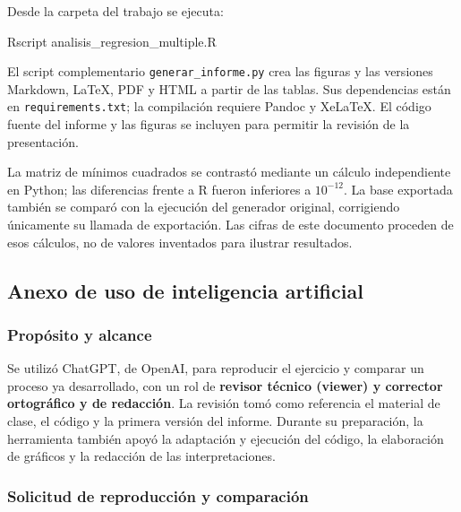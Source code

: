 \documentclass[
  11pt,
  letterpaper,
]{article}
\newenvironment{Shaded}{}{}
\newcommand{\ExtensionTok}[1]{#1}
\newcommand{\NormalTok}[1]{#1}
\begin{document}
Desde la carpeta del trabajo se ejecuta:

\begin{Shaded}
\begin{Highlighting}[]
\ExtensionTok{Rscript}\NormalTok{ analisis\_regresion\_multiple.R}
\end{Highlighting}
\end{Shaded}

El script complementario \texttt{generar\_informe.py} crea las figuras y
las versiones Markdown, LaTeX, PDF y HTML a partir de las tablas. Sus
dependencias están en \texttt{requirements.txt}; la compilación requiere
Pandoc y XeLaTeX. El código fuente del informe y las figuras se incluyen
para permitir la revisión de la presentación.

La matriz de mínimos cuadrados se contrastó mediante un cálculo
independiente en Python; las diferencias frente a R fueron inferiores a
\(10^{-12}\). La base exportada también se comparó con la ejecución del
generador original, corrigiendo únicamente su llamada de exportación.
Las cifras de este documento proceden de esos cálculos, no de valores
inventados para ilustrar resultados.

\newpage

\hypertarget{anexo-de-uso-de-inteligencia-artificial}{%
\subsection{Anexo de uso de inteligencia
artificial}\label{anexo-de-uso-de-inteligencia-artificial}}

\hypertarget{propuxf3sito-y-alcance}{%
\subsubsection{Propósito y alcance}\label{propuxf3sito-y-alcance}}

Se utilizó ChatGPT, de OpenAI, para reproducir el ejercicio y comparar
un proceso ya desarrollado, con un rol de \textbf{revisor técnico
(viewer) y corrector ortográfico y de redacción}. La revisión tomó como
referencia el material de clase, el código y la primera versión del
informe. Durante su preparación, la herramienta también apoyó la
adaptación y ejecución del código, la elaboración de gráficos y la
redacción de las interpretaciones.

\hypertarget{solicitud-de-reproducciuxf3n-y-comparaciuxf3n}{%
\subsubsection{Solicitud de reproducción y
comparación}\label{solicitud-de-reproducciuxf3n-y-comparaciuxf3n}}
\end{document}
